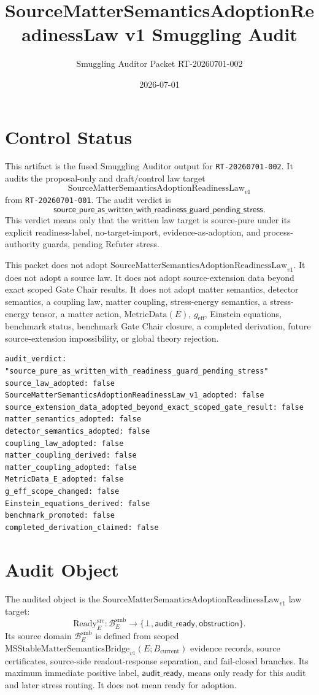 \documentclass[11pt]{article}
\title{SourceMatterSemanticsAdoptionReadinessLaw v1 Smuggling Audit}
\author{Smuggling Auditor Packet RT-20260701-002}
\date{2026-07-01}
\newcommand{\Bcur}{B_{\mathrm{current}}}
\newcommand{\MSBridge}{\mathrm{MSStableMatterSemanticsBridge}_{v1}}
\newcommand{\SMSAR}{\mathrm{SourceMatterSemanticsAdoptionReadinessLaw}_{v1}}
\newcommand{\BridgeDom}{\mathcal B^{\mathrm{smb}}_E}
\newcommand{\Ready}{\mathrm{Ready}^{\mathrm{src}}_E}
\newcommand{\AuditReady}{\mathsf{audit\_ready}}
\newcommand{\Obstruction}{\mathsf{obstruction}}
\newcommand{\Bottom}{\bot}
\newcommand{\MetricData}{\mathrm{MetricData}}
\newcommand{\geff}{g_{\mathrm{eff}}}
\newcommand{\AuditVerdict}{\mathsf{source\_pure\_as\_written\_with\_readiness\_guard\_pending\_stress}}
\begin{document}
\maketitle

\section{Control Status}

This artifact is the fused Smuggling Auditor output for
\texttt{RT-20260701-002}. It audits the proposal-only and draft/control
law target
\[
  \SMSAR
\]
from \texttt{RT-20260701-001}. The audit verdict is
\[
  \AuditVerdict.
\]
This verdict means only that the written law target is source-pure under its
explicit readiness-label, no-target-import, evidence-as-adoption, and
process-authority guards, pending Refuter stress.

This packet does not adopt \(\SMSAR\). It does not adopt a source law. It does
not adopt source-extension data beyond exact scoped Gate Chair results. It
does not adopt matter semantics, detector semantics, a coupling law, matter
coupling, stress-energy semantics, a stress-energy tensor, a matter action,
\(\MetricData(E)\), \(\geff\), Einstein equations, benchmark status, benchmark
Gate Chair closure, a completed derivation, future source-extension
impossibility, or global theory rejection.

\begin{verbatim}
audit_verdict: "source_pure_as_written_with_readiness_guard_pending_stress"
source_law_adopted: false
SourceMatterSemanticsAdoptionReadinessLaw_v1_adopted: false
source_extension_data_adopted_beyond_exact_scoped_gate_result: false
matter_semantics_adopted: false
detector_semantics_adopted: false
coupling_law_adopted: false
matter_coupling_derived: false
matter_coupling_adopted: false
MetricData_E_adopted: false
g_eff_scope_changed: false
Einstein_equations_derived: false
benchmark_promoted: false
completed_derivation_claimed: false
\end{verbatim}

\section{Audit Object}

The audited object is the \(\SMSAR\) law target:
\[
  \Ready:\BridgeDom\to
  \{\Bottom,\AuditReady,\Obstruction\}.
\]
Its source domain \(\BridgeDom\) is defined from scoped
\(\MSBridge(E;\Bcur)\) evidence records, source certificates, source-side
readout-response separation, and fail-closed branches. Its maximum immediate
positive label, \(\AuditReady\), means only ready for this audit and later
stress routing. It does not mean ready for adoption.
\end{document}
